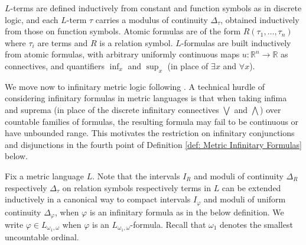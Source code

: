 \documentclass[12pt]{amsart}
\begin{document}
${L}$-terms are defined inductively from constant and function symbols as in discrete logic, and each $L$-term $\tau$ carries a modulus of continuity $\Delta_\tau$, obtained inductively from those on function symbols. Atomic formulas are of the form $R(\tau_1,\dots,\tau_{n})$ where $\tau_i$ are terms and $R$ is a relation symbol. ${L}$-formulas are built inductively from atomic formulas, with
arbitrary uniformly continuous maps $u\colon \mathbb R^n\to\mathbb R$ as connectives, and quantifiers $\inf_x$ and $\sup_x$ (in place of $\exists x$ and $\forall x$). 

We move now to infinitary metric logic following \cite{Ben_Yaacov_2009}.
A technical hurdle of considering infinitary formulas in metric languages is that when taking infima and suprema (in place of the discrete infinitary connectives $\bigvee$ and $\bigwedge$) over countable families of formulas, the resulting formula may fail to be continuous or have unbounded range. This motivates the restriction on infinitary conjunctions and disjunctions in the fourth point of Definition \ref{def: Metric Infinitary Formulas} below. 

Fix a metric language $L$. Note that the intervals $I_R$ and moduli of continuity $\Delta_R$ respectively $\Delta_\tau$ on relation symbols respectively terms in $L$ can be extended inductively in a canonical way to compact intervals $I_\varphi$ and moduli of uniform continuity $\Delta_\varphi$, when $\varphi$ is an infinitary formula as in the below definition. We write $\varphi\in L_{\omega_1, \omega}$ when $\varphi$ is an $L_{\omega_1,\omega}$-formula. Recall that $\omega_1$ denotes the smallest uncountable ordinal.
\end{document}
